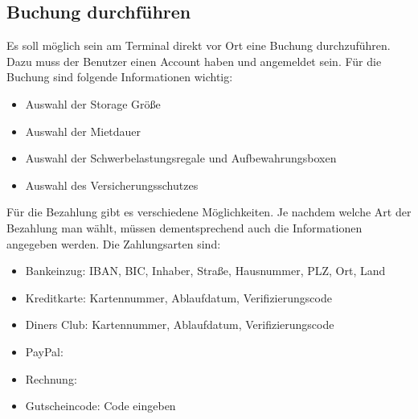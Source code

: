 \subsection{Buchung durchführen}
Es soll möglich sein am Terminal direkt vor Ort eine Buchung durchzuführen. Dazu muss der Benutzer einen Account haben und angemeldet sein. Für die Buchung sind folgende Informationen wichtig:
\begin{itemize}
    \item Auswahl der Storage Größe
    \item Auswahl der Mietdauer
    \item Auswahl der Schwerbelastungsregale und Aufbewahrungsboxen
    \item Auswahl des Versicherungsschutzes
\end{itemize}
Für die Bezahlung gibt es verschiedene Möglichkeiten. Je nachdem welche Art der Bezahlung man wählt, müssen dementsprechend auch die Informationen angegeben werden. Die Zahlungsarten sind:
\begin{itemize}
    \item Bankeinzug: IBAN, BIC, Inhaber, Straße, Hausnummer, PLZ, Ort, Land
    \item Kreditkarte: Kartennummer, Ablaufdatum, Verifizierungscode
    \item Diners Club: Kartennummer, Ablaufdatum, Verifizierungscode
    \item PayPal:
    \item Rechnung:
    \item Gutscheincode: Code eingeben
\end{itemize}
